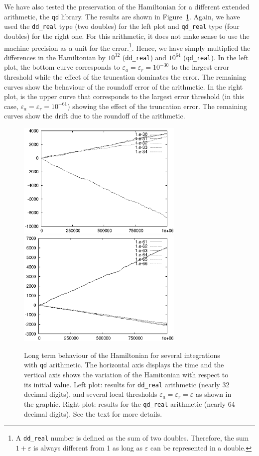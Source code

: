 \documentclass[12pt,twoside]{article}
\begin{document}
We have also tested the preservation of the Hamiltonian for a
different extended arithmetic, the \texttt{qd} library. The results
are shown in Figure~\ref{fig:ham-qd}. Again, we have used the
\texttt{dd\_real} type (two doubles) for the left plot and
\texttt{qd\_real} type (four doubles) for the right one.  For this
arithmetic, it does not make sense to use the machine precision as a
unit for the error.\footnote{A \texttt{dd\_real} number is defined as
  the sum of two doubles. Therefore, the sum $1+\varepsilon$ is always
  different from 1 as long as $\varepsilon$ can be represented in a
  double.}. Hence, we have simply multiplied the differences in the
Hamiltonian by $10^{32}$ (\texttt{dd\_real}) and $10^{64}$
(\texttt{qd\_real}). In the left plot, the bottom curve corresponds to
$\varepsilon_a=\varepsilon_r=10^{-30}$ to the largest error threshold
while the effect of the truncation dominates the error. The remaining
curves show the behaviour of the roundoff error of the arithmetic.  In
the right plot, is the upper curve that corresponds to the largest
error threshold (in this case, $\varepsilon_a=\varepsilon_r=10^{-61}$)
showing the effect of the truncation error. The remaining curves show
the drift due to the roundoff of the arithmetic.

\begin{figure}
\includegraphics[width=80mm]{eps/driftqd1.eps}\hfill
\includegraphics[width=80mm]{eps/driftqd2.eps}
\caption{Long term behaviour of the Hamiltonian for several
  integrations with \texttt{qd} arithmetic. The horizontal axis
  displays the time and the vertical axis shows the variation of the
  Hamitonian with respect to its initial value. Left plot: results for
  \texttt{dd\_real} arithmetic (nearly 32 decimal digits), and several
  local thresholds $\varepsilon_a=\varepsilon_r=\varepsilon$ as shown
  in the graphic. Right plot: results for the \texttt{qd\_real}
  arithmetic (nearly 64 decimal digits). See the text for more
  details.}
\label{fig:ham-qd}
\end{figure}
\end{document}
